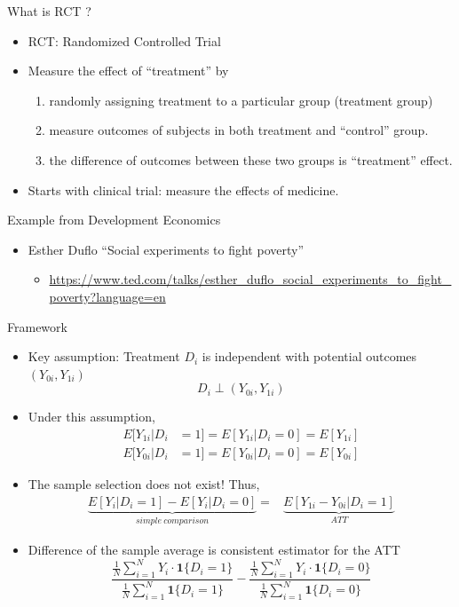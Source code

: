\documentclass[
  ignorenonframetext,
]{beamer}
\providecommand{\tightlist}{%
  \setlength{\itemsep}{0pt}\setlength{\parskip}{0pt}}
\begin{document}
\begin{frame}{What is RCT ?}
\protect\hypertarget{what-is-rct}{}
\begin{itemize}
\item
  RCT: Randomized Controlled Trial
\item
  Measure the effect of ``treatment'' by

  \begin{enumerate}
  \item
    randomly assigning treatment to a particular group (treatment group)
  \item
    measure outcomes of subjects in both treatment and ``control''
    group.
  \item
    the difference of outcomes between these two groups is ``treatment''
    effect.
  \end{enumerate}
\item
  Starts with clinical trial: measure the effects of medicine.
\end{itemize}
\end{frame}

\begin{frame}{Example from Development Economics}
\protect\hypertarget{example-from-development-economics}{}
\begin{itemize}
\item
  Esther Duflo ``Social experiments to fight poverty''

  \begin{itemize}
  \tightlist
  \item
    \url{https://www.ted.com/talks/esther_duflo_social_experiments_to_fight_poverty?language=en}
  \end{itemize}
\end{itemize}
\end{frame}

\begin{frame}{Framework}
\protect\hypertarget{framework-2}{}
\begin{itemize}
\item
  Key assumption: Treatment \(D_{i}\) is independent with potential
  outcomes \((Y_{0i},Y_{1i})\) \[D_{i}\perp(Y_{0i},Y_{1i})\]
\item
  Under this assumption, \[\begin{aligned}
  E[Y_{1i}|D_{i} & =1]=E[Y_{1i}|D_{i}=0]=E[Y_{1i}]\\
  E[Y_{0i}|D_{i} & =1]=E[Y_{0i}|D_{i}=0]=E[Y_{0i}]\end{aligned}\]
\item
  The sample selection does not exist! Thus, \[\begin{aligned}
  \underbrace{E[Y_{i}|D_{i}=1]-E[Y_{i}|D_{i}=0]}_{simple\ comparison}= & \underbrace{E[Y_{1i}-Y_{0i}|D_{i}=1]}_{ATT}\end{aligned}\]
\item
  Difference of the sample average is consistent estimator for the ATT
  \[\frac{\frac{1}{N}\sum_{i=1}^{N}Y_{i}\cdot\mathbf{1}\{D_{i}=1\}}{\frac{1}{N}\sum_{i=1}^{N}\mathbf{1}\{D_{i}=1\}}-\frac{\frac{1}{N}\sum_{i=1}^{N}Y_{i}\cdot\mathbf{1}\{D_{i}=0\}}{\frac{1}{N}\sum_{i=1}^{N}\mathbf{1}\{D_{i}=0\}}\]
\end{itemize}
\end{frame}
\end{document}

